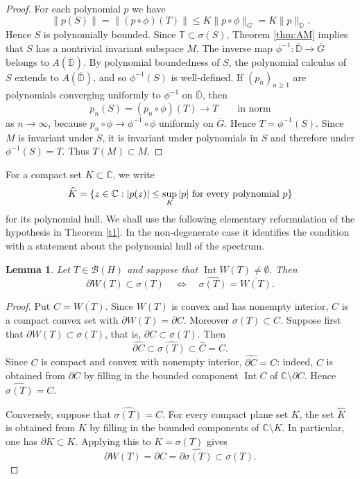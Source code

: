 \documentclass[11pt]{amsart}
\numberwithin{equation}{section}
\newtheorem{lemma}[theorem]{Lemma}
\theoremstyle{definition}
\theoremstyle{remark}
\newcommand{\CC}{\mathbb{C}}
\newcommand{\DD}{\mathbb{D}}
\newcommand{\BH}{\mathcal B(H)}
\begin{document}
\begin{proof}
For each polynomial $p$ we have
$$
\|p(S)\|=\|(p\circ \phi)(T)\|\le K\|p\circ\phi\|_{\overline G}=K\|p\|_{\overline{\DD}}.
$$
Hence $S$ is polynomially bounded. Since $\mathbb T \subset\sigma(S)$, Theorem \ref{thm:AM} implies that $S$ has a nontrivial invariant subspace $M$.
The inverse map $\phi^{-1}:\overline{\DD}\to\overline G$ belongs to $A(\overline{\DD})$. By polynomial boundedness of $S$, the polynomial calculus of $S$ extends to $A(\overline{\DD})$, and so $\phi^{-1}(S)$ is well-defined. If $(p_n)_{n\ge1}$ are polynomials converging uniformly to $\phi^{-1}$ on $\overline{\DD}$, then
$$
p_n(S)=(p_n\circ\phi)(T)\longrightarrow T \qquad \text{in norm}
$$
as $n\to\infty$, because $p_n\circ\phi\to\phi^{-1}\circ\phi$ uniformly on $\overline G$. Hence $T=\phi^{-1}(S)$. Since $M$ is invariant under $S$, it is invariant under polynomials in $S$ and therefore under $\phi^{-1}(S)=T$. Thus $T(M)\subset M$.
\end{proof}

For a compact set $K\subset\CC$, we write
\[
    \widehat K=\{z\in\CC: |p(z)|\le \sup_K |p|\hbox{ for every polynomial }p\}
\]
for its polynomial hull. We shall use the following elementary reformulation of the hypothesis in
Theorem \ref{t1}. In the non-degenerate case it identifies the condition with
a statement about the polynomial hull of the spectrum.

\begin{lemma}\label{lem:hull-numerical-range}
Let $T\in\BH$ and suppose that $\operatorname{Int} W(T)\ne\emptyset$.
Then
\[
        \partial W(T)\subset\sigma(T)
        \quad\Longleftrightarrow\quad
        \widehat{\sigma(T)}=\overline{W(T)}.
\]
\end{lemma}

\begin{proof}
Put $C=\overline{W(T)}$. Since $W(T)$ is convex and has nonempty
interior, $C$ is a compact convex set with $\partial W(T)=\partial C$.
Moreover $\sigma(T)\subset C$. Suppose first that
$\partial W(T)\subset\sigma(T)$, that is, $\partial C\subset\sigma(T)$.
Then
\[
        \widehat{\partial C}\subset\widehat{\sigma(T)}\subset\widehat C=C .
\]
Since $C$ is compact and convex with nonempty interior,
$\widehat{\partial C}=C$: indeed, $C$ is obtained from $\partial C$ by
filling in the bounded component $\operatorname{Int} C$ of
$\CC\setminus\partial C$. Hence $\widehat{\sigma(T)}=C$.

Conversely, suppose that $\widehat{\sigma(T)}=C$. For every compact plane
set $K$, the set $\widehat K$ is obtained from $K$ by filling in the bounded
components of $\CC\setminus K$.  In particular, one has
$\partial\widehat K\subset K$. Applying this to $K=\sigma(T)$ gives
\[
        \partial W(T)=\partial C=\partial\widehat{\sigma(T)}
        \subset\sigma(T).
\]
\end{proof}
\end{document}
